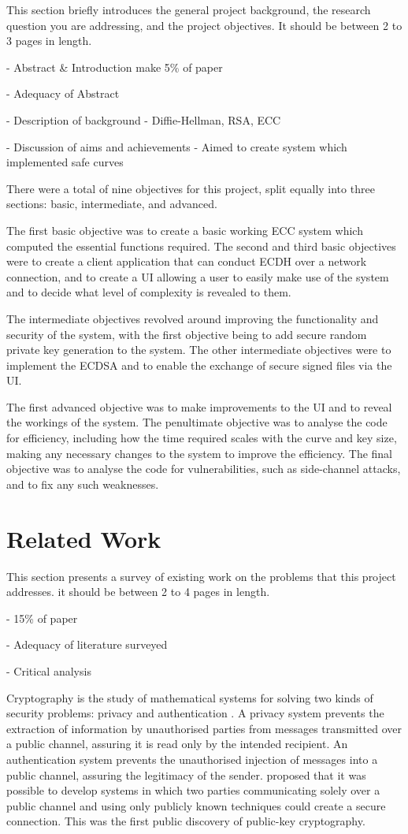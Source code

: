 \documentclass[12pt,a4paper]{article}
\begin{document}
This section briefly introduces the general project background, the research question you are addressing, and the project objectives.
It should be between 2 to 3 pages in length.

- Abstract \& Introduction make 5\% of paper

- Adequacy of Abstract

- Description of background - Diffie-Hellman, RSA, ECC

- Discussion of aims and achievements - Aimed to create system which implemented safe curves 

There were a total of nine objectives for this project, split equally into three sections: basic, intermediate, and advanced. 

The first basic objective was to create a basic working ECC system which computed the essential functions required. 
The second and third basic objectives were to create a client application that can conduct ECDH over a network connection, 
and to create a UI allowing a user to easily make use of the system and to decide what level of complexity is revealed to them. 

The intermediate objectives revolved around improving the functionality and security of the system, 
with the first objective being to add secure random private key generation to the system. 
The other intermediate objectives were to implement the ECDSA and to enable the exchange of secure signed files via the UI. 

The first advanced objective was to make improvements to the UI and to reveal the workings of the system. 
The penultimate objective was to analyse the code for efficiency, including how the time required scales with the curve and key size, 
making any necessary changes to the system to improve the efficiency. 
The final objective was to analyse the code for vulnerabilities, such as side-channel attacks, and to fix any such weaknesses. 


\section{Related Work}
This section presents a survey of existing work on the problems that this project addresses. 
it should be between 2 to 4 pages in length. 

- 15\% of paper

- Adequacy of literature surveyed

- Critical analysis

Cryptography is the study of mathematical systems for solving two kinds of security problems: privacy and authentication \cite{1055638}. 
A privacy system prevents the extraction of information by unauthorised parties from messages transmitted over a public channel, assuring it is read only by the intended recipient. 
An authentication system prevents the unauthorised injection of messages into a public channel, assuring the legitimacy of the sender. 
\cite{1055638} proposed that it was possible to develop systems in which two parties communicating solely over a public channel and using only publicly known techniques could create a secure connection. 
This was the first public discovery of public-key cryptography.
\end{document}
